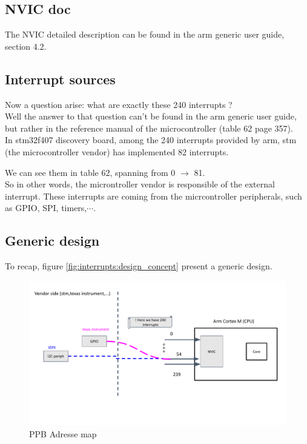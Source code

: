 \subsection{NVIC doc}

The NVIC detailed description can be found in the arm generic user guide, section 4.2. 

\subsection{Interrupt sources}
\label{sub:Interrupt_sources}

Now a question arise: what are exactly these 240 interrupts ?\\

Well the answer to that question can't be found in the arm generic user guide, but rather in the reference manual of the microcontroller (table 62 page 357).\\

In stm32f407 discovery board, among the 240 interrupts provided by arm, stm (the microcontroller vendor) has implemented 82 interrupts.

We can see them in table 62, spanning from 0 $\rightarrow$ 81.\\

So in other words, the microntroller vendor is responsible of the external interrupt. 
These interrupts are coming from the micrcontroller peripherals, such as GPIO, SPI, timers,$\cdots$. 

\subsection{Generic design}
\label{sub:interrupt_generic_design}

To recap,  figure \autoref{fig:interrupts:design_concept} present a generic design.

\begin{figure}[h]
\centering
\includegraphics[scale=0.7,frame]{Figures/interrupts/design_concept}
\caption{PPB Adresse map}
\label{fig:interrupts:design_concept}
\end{figure}


